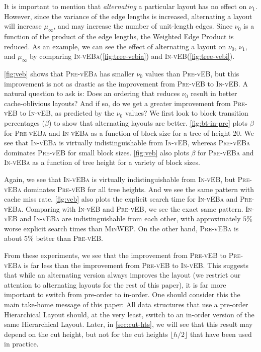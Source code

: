 \documentclass[10pt,conference,letterpaper]{IEEEtran}
\newcommand{\note}[1]{}
\newcommand{\comment}[1]{}
\newcommand{\HL}{Hierarchical Layout\xspace}
\newcommand{\pvl}{\textsc{Pre-vEB}\xspace}
\newcommand{\pvla}{\textsc{Pre-vEBa}\xspace}
\newcommand{\ivl}{\textsc{In-vEB}\xspace}
\newcommand{\ivla}{\textsc{In-vEBa}\xspace}
\newcommand{\WEP}{Weighted Edge Product\xspace}
\newcommand{\FLOOR}[1]{\ensuremath{\lfloor #1 \rfloor}\xspace}
\newcommand{\pmean}[1][p]{\ensuremath{\mu_{#1}}\xspace}
\newcommand{\pwmean}[1][p]{\ensuremath{\nu_{#1}}\xspace}
\newcommand{\PB}{\ensuremath{\beta}\xspace}
\newcommand{\minwep}{\textsc{MinWEP}\xspace}
\begin{document}
It is important to mention that \textit{alternating} a particular layout has no effect on \pwmean[1]. However, since the variance of the edge lengths is increased, alternating a layout will increase \pmean[\infty], and may increase the number of unit-length edges. Since \pwmean[0] is a function of the product of the edge lengths, the \WEP is reduced. As an example, we can see the effect of alternating a layout on \pwmean[0], \pwmean[1], and \pmean[\infty]
by comparing \ivla (\autoref{fig:tree-vebia}) and \ivl (\autoref{fig:tree-vebi}). 
\note{See what? Fixed.}
 
\autoref{fig:veb} shows that \pvla has smaller \pwmean[0] values than \pvl, but this improvement is not as drastic as the improvement from \pvl to \ivl. A natural question to ask is: Does an ordering that reduces \pwmean[0] result in better cache-oblivious layouts? And if so, do we get a greater improvement from \pvl to \ivl, as predicted by the \pwmean[0] values? We first look to block transition percentages (\PB) to show that alternating layouts are better.
\autoref{fig:bt-in-pre} plots \PB for \pvla and \ivla as a function of block size for a tree of height 20. We see that \ivla is virtually indistinguishable from \ivl, whereas \pvla dominates \pvl for small block sizes. 
\autoref{fig:veb} also plots \PB for \pvla and \ivla as a function of tree height for a variety of block sizes. 
\comment{for these block sizes, }
Again, 
we see that \ivla is virtually indistinguishable from \ivl, but \pvla dominates \pvl for all tree heights. And we see the same pattern with cache miss rate. \autoref{fig:veb} also plots the explicit search time for \ivla and \pvla. Comparing with \ivl and \pvl, we see the exact same pattern. \ivl and \ivla are indistinguishable from each other, with approximately $5\%$ worse explicit search times than \minwep. On the other hand, \pvla is about $5\%$ better than \pvl. 

From these experiments, we see that the improvement from \pvl to \pvla is far less than the improvement from \pvl to \ivl. This suggests that while an alternating version always improves the layout
(we restrict our attention to alternating layouts for the rest of this paper), it is far more important to switch from pre-order to in-order. One should consider this the main take-home message of this paper: All data structures that use a pre-order \HL should, at the very least, switch to an in-order version of the same \HL. Later, in \autoref{sec:cut-hts}, we will see that this result may depend on the cut height, but not for the cut heights $\FLOOR{h/2}$ that have been used in practice. 
\end{document}
